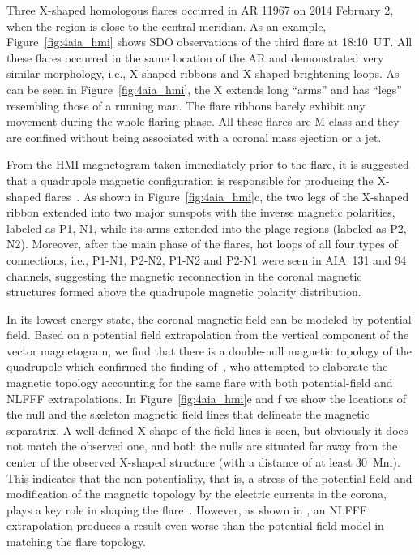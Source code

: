 \documentclass[twocolumn]{aastex6} %
\newcommand{\Fig}{{Figure}}
\begin{document}
\begin{CJK*}{UTF8}{gbsn}

Three X-shaped homologous flares occurred in AR 11967 on 2014 February
2, when the region is close to the central meridian. As an example,
\Fig~\ref{fig:4aia_hmi} shows SDO observations of the third flare
at 18:10~UT. All these flares occurred in the same location
of the AR and demonstrated very similar morphology, i.e., X-shaped
ribbons and X-shaped brightening loops. As can be seen in
\Fig~\ref{fig:4aia_hmi}, the X extends long ``arms'' and has ``legs'' resembling those of
a running man. The flare ribbons {barely exhibit any movement
during the whole flaring phase}. All these flares are M-class and they
are confined without being associated with a coronal mass ejection or
a jet.

From the HMI magnetogram taken immediately prior to the flare, it is
suggested that a quadrupole magnetic configuration is responsible for
producing the X-shaped flares~\citep{LiuR2016NatSR, Kawabata2017}. As
shown in {\Fig~\ref{fig:4aia_hmi}c}, the two legs of the X-shaped
ribbon extended into two major sunspots with the inverse magnetic
polarities, labeled as P1, N1, while its arms extended into the
plage regions (labeled as P2, N2). Moreover, after the main phase of
the flares, hot loops of all four types of connections, i.e., P1-N1,
P2-N2, P1-N2 and P2-N1 were seen in AIA~131 and 94 channels,
suggesting the magnetic reconnection in the coronal magnetic
structures formed above the quadrupole magnetic polarity distribution.

In its lowest energy state, the coronal magnetic field can be modeled
by potential field. Based on a potential field extrapolation from the
vertical component of the vector magnetogram, we find that there is a
double-null magnetic topology of the quadrupole which confirmed the
finding of~\citet{LiuR2016NatSR}, who attempted to elaborate
the magnetic topology accounting for the same flare with {both potential-field
and NLFFF extrapolations}. In {\Fig~\ref{fig:4aia_hmi}e and f} we
show the locations of the null and the skeleton magnetic field lines
that delineate the magnetic separatrix. A well-defined X shape of
the field lines is seen, but obviously it does not match the observed
one, and both the nulls are situated far away from the center of the observed X-shaped
structure (with a distance of at least 30~Mm).
This indicates that the non-potentiality, that is, a stress of the
potential field and modification of the magnetic topology by the
electric currents in the corona, plays a key role in shaping the flare~\citep{Kawabata2017}.
{However, as shown in \citet{LiuR2016NatSR}, an NLFFF extrapolation produces a result even worse than the potential
field model in matching the flare topology}.




\end{CJK*}
\end{document}
